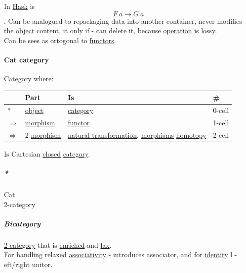 \documentclass[11pt]{article}
\begin{document}
In \hyperref[org02813f7]{Hask} is $$ F \ a \to G \ a $$. Can be analogued to repackaging data into another container, never modifies the \hyperref[org4be0e9d]{object} content, it only if - can delete it, because \hyperref[org1173fe8]{operation} is lossy.\\

Can be sees as ortogonal to \hyperref[orgdd21ed6]{functors}.\\

\paragraph{\label{orga055269}Cat category}
\label{sec:org85078ee}
\hyperref[org0450535]{Category} \hyperref[org3e5903d]{where}:\\

\begin{center}
\begin{tabular}{llll}
 & Part & Is & \#\\
\hline
* & \hyperref[org4be0e9d]{object} & \hyperref[org0450535]{category} & 0-cell\\
\(\Rightarrow\) & \hyperref[org5de09d4]{morphism} & \hyperref[orgf2f6841]{functor} & 1-cell\\
\(\Rightarrow\) & 2-\hyperref[org5de09d4]{morphism} & \hyperref[orgc8e9bc9]{natural transformation}, \hyperref[org6c2fa5c]{morphisms} \hyperref[orgb19d3ed]{homotopy} & 2-cell\\
\end{tabular}
\end{center}


Is Cartesian \hyperref[orgcdd7006]{closed} \hyperref[org0450535]{category}.\\

\subparagraph{\emph{*}}
\label{sec:orgff45eea}
\label{orgc68d176}Cat\\
\label{org44691ab}2-category\\

\subparagraph{Bicategory}
\label{sec:org8ad5cd2}
\hyperref[org44691ab]{2-category} that is \hyperref[orgc0d8c10]{enriched} and \hyperref[org40220c9]{lax}.\\

For handling relaxed \hyperref[org488de22]{associativity} - introduces associator, and for \hyperref[org9b95fd5]{identity} l -eft/right unitor.\\
\end{document}

